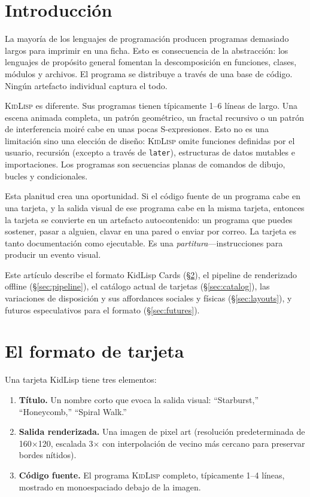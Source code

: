 \documentclass[10pt,letterpaper,twocolumn]{article}
\newcommand{\kidlisp}{\textsc{KidLisp}}
\begin{document}

\section{Introducci\'on}

La mayor\'ia de los lenguajes de programaci\'on producen programas demasiado largos para imprimir en una ficha. Esto es consecuencia de la abstracci\'on: los lenguajes de prop\'osito general fomentan la descomposici\'on en funciones, clases, m\'odulos y archivos. El programa se distribuye a trav\'es de una base de c\'odigo. Ning\'un artefacto individual captura el todo.

\kidlisp{} es diferente. Sus programas tienen t\'ipicamente 1--6 l\'ineas de largo. Una escena animada completa, un patr\'on geom\'etrico, un fractal recursivo o un patr\'on de interferencia moir\'{e} cabe en unas pocas S-expresiones. Esto no es una limitaci\'on sino una elecci\'on de dise\~no: \kidlisp{} omite funciones definidas por el usuario, recursi\'on (excepto a trav\'es de \texttt{later}), estructuras de datos mutables e importaciones. Los programas son secuencias planas de comandos de dibujo, bucles y condicionales.

Esta planitud crea una oportunidad. Si el c\'odigo fuente de un programa cabe en una tarjeta, y la salida visual de ese programa cabe en la misma tarjeta, entonces la tarjeta se convierte en un artefacto autocontenido: un programa que puedes sostener, pasar a alguien, clavar en una pared o enviar por correo. La tarjeta es tanto documentaci\'on como ejecutable. Es una \emph{partitura}---instrucciones para producir un evento visual.

Este art\'iculo describe el formato KidLisp Cards (\S\ref{sec:format}), el pipeline de renderizado offline (\S\ref{sec:pipeline}), el cat\'alogo actual de tarjetas (\S\ref{sec:catalog}), las variaciones de disposici\'on y sus affordances sociales y f\'isicas (\S\ref{sec:layouts}), y futuros especulativos para el formato (\S\ref{sec:futures}).


\section{El formato de tarjeta}
\label{sec:format}

Una tarjeta KidLisp tiene tres elementos:

\begin{enumerate}
  \item \textbf{T\'itulo.} Un nombre corto que evoca la salida visual: ``Starburst,'' ``Honeycomb,'' ``Spiral Walk.''
  \item \textbf{Salida renderizada.} Una imagen de pixel art (resoluci\'on predeterminada de 160$\times$120, escalada 3$\times$ con interpolaci\'on de vecino m\'as cercano para preservar bordes n\'itidos).
  \item \textbf{C\'odigo fuente.} El programa \kidlisp{} completo, t\'ipicamente 1--4 l\'ineas, mostrado en monoespaciado debajo de la imagen.
\end{enumerate}
\end{document}
